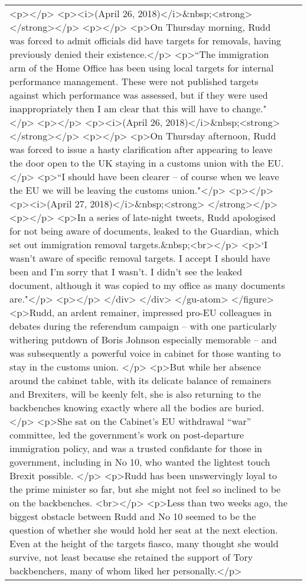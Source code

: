 \documentclass[]{article}
\begin{document}
\begin{table}[!h]
{\begin{tabular}[t]{ll}
    <p></p>
    <p><i>(April 26, 2018)</i>\&nbsp;<strong> </strong></p>
    <p></p>
    <p>On Thursday morning, Rudd was forced to admit officials did have targets for removals, having previously denied their existence.</p>
    <p>“The immigration arm of the Home Office has been using local targets for internal performance management. These were not published targets against which performance was assessed, but if they were used inappropriately then I am clear that this will have to change."</p>
    <p></p>
    <p><i>(April 26, 2018)</i>\&nbsp;<strong> </strong></p>
    <p></p>
    <p>On Thursday afternoon, Rudd was forced to issue a hasty clarification after appearing to leave the door open to the UK staying in a customs union with the EU.</p>
    <p>“I should have been clearer – of course when we leave the EU we will be leaving the customs union."</p>
    <p></p>
    <p><i>(April 27, 2018)</i>\&nbsp;<strong> </strong></p>
    <p></p>
    <p>In a series of late-night tweets, Rudd apologised for not being aware of documents, leaked to the Guardian, which set out immigration removal targets.\&nbsp;<br></p>
    <p>‘I wasn’t aware of specific removal targets. I accept I should have been and I’m sorry that I wasn’t. I didn’t see the leaked document, although it was copied to my office as many documents are."</p>
    <p></p>
   </div>
  </div>
 </gu-atom> 
</figure> 
<p>Rudd, an ardent remainer, impressed pro-EU colleagues in debates during the referendum campaign – with one particularly withering putdown of Boris Johnson especially memorable – and was subsequently a powerful voice in cabinet for those wanting to stay in the customs union. </p> 
<p>But while her absence around the cabinet table, with its delicate balance of remainers and Brexiters, will be keenly felt, she is also returning to the backbenches knowing exactly where all the bodies are buried.</p> 
<p>She sat on the Cabinet’s EU withdrawal “war” committee, led the government’s work on post-departure immigration policy, and was a trusted confidante for those in government, including in No 10, who wanted the lightest touch Brexit possible. </p> 
<p>Rudd has been unswervingly loyal to the prime minister so far, but she might not feel so inclined to be on the backbenches. <br></p> 
<p>Less than two weeks ago, the biggest obstacle between Rudd and No 10 seemed to be the question of whether she would hold her seat at the next election. Even at the height of the targets fiasco, many thought she would survive, not least because she retained the support of Tory backbenchers, many of whom liked her personally.</p> 

\end{tabular}}
\end{table}
\end{document}
